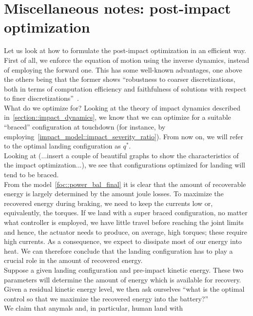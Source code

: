 \documentclass[letterpaper, 10 pt, conference]{ieeeconf}  %
\begin{document}
\section{Miscellaneous notes: post-impact optimization}\label{section::post_impact_opt_formulation}
 
Let us look at how to formulate the post-impact optimization in an efficient way.\\
First of all, we enforce the equation of motion using the inverse dynamics, instead of employing the forward one. This has some well-known advantages, one above the others being that the former shows \enquote{robustness to coarser
discretizations, both in terms of computation efficiency and
faithfulness of solutions with respect to finer discretizations}~\cite{to::ferrolho2021inverse}.\\
What do we optimize for?
Looking at the theory of impact dynamics described in~\ref{section::impact_dynamics}, we know that we can optimize for a suitable \enquote{braced} configuration at touchdown (for instance, by employing~\eqref{impact_model::impact_severity_ratio}). From now on, we will refer to the optimal landing configuration as $q^{*}$.\\
Looking at (...insert a couple of beautiful graphs to show the characteristics of the impact optimization...), we see that configurations optimized for landing will tend to be braced.\\
From the model~\eqref{foc::power_bal_final} it is clear that the amount of recoverable energy is largely determined by the amount joule losses. To maximize the recovered energy during braking, we need to keep the currents low or, equivalently, the torques. If we land with a super braced configuration, no matter what controller is employed, we have little travel before reaching the joint limits and hence, the actuator needs to produce, on average, high torques; these require high currents. As a consequence, we expect to dissipate most of our energy into heat. We can therefore conclude that the landing configuration has to play a crucial role in the amount of recovered energy. \\
Suppose a given landing configuration and pre-impact kinetic energy. These two parameters will determine the amount of energy which is available for recovery. Given a residual kinetic energy level, we then ask ourselves \enquote{what is the optimal control so that we maximize the recovered energy into the battery?}\\
We claim that anymals and, in particular, human land with 
\end{document}
